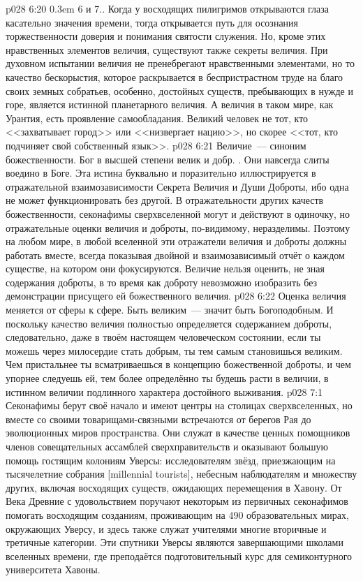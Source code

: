 \vs p028 6:20 \kern0.3em 6 и 7.\bibnobreakspace{}. Когда у восходящих пилигримов открываются глаза касательно значения времени, тогда открывается путь для осознания торжественности доверия и понимания святости служения. Но, кроме этих нравственных элементов величия, существуют также секреты величия. При духовном испытании величия не пренебрегают нравственными элементами, но то качество бескорыстия, которое раскрывается в беспристрастном труде на благо своих земных собратьев, особенно, достойных существ, пребывающих в нужде и горе, является истинной  планетарного величия. А  величия в таком мире, как Урантия, есть проявление самообладания. Великий человек не тот, кто <<захватывает город>> или <<низвергает нацию>>, но скорее <<тот, кто подчиняет свой собственный язык>>.
\vs p028 6:21 Величие~--- синоним божественности. Бог в высшей степени велик и добр. . Они навсегда слиты воедино в Боге. Эта истина буквально и поразительно иллюстрируется в отражательной взаимозависимости Секрета Величия и Души Доброты, ибо одна не может функционировать без другой. В отражательности других качеств божественности, секонафимы сверхвселенной могут и действуют в одиночку, но отражательные оценки величия и доброты, по\hyp{}видимому, неразделимы. Поэтому на любом мире, в любой вселенной эти отражатели величия и доброты должны работать вместе, всегда показывая двойной и взаимозависимый отчёт о каждом существе, на котором они фокусируются. Величие нельзя оценить, не зная содержания доброты, в то время как доброту невозможно изобразить без демонстрации присущего ей божественного величия.
\vs p028 6:22 Оценка величия меняется от сферы к сфере. Быть великим~--- значит быть Богоподобным. И поскольку качество величия полностью определяется содержанием доброты, следовательно, даже в твоём настоящем человеческом состоянии, если ты можешь через милосердие стать добрым, ты тем самым становишься великим. Чем пристальнее ты всматриваешься в концепцию божественной доброты, и чем упорнее следуешь ей, тем более определённо ты будешь расти в величии, в истинном величии подлинного характера достойного выживания.
\vs p028 7:1 Секонафимы берут своё начало и имеют центры на столицах сверхвселенных, но вместе со своими товарищами\hyp{}связными встречаются от берегов Рая до эволюционных миров пространства. Они служат в качестве ценных помощников членов совещательных ассамблей сверхправительств и оказывают большую помощь гостящим колониям Уверсы: исследователям звёзд, приезжающим на тысячелетние собрания [millennial tourists], небесным наблюдателям и множеству других, включая восходящих существ, ожидающих перемещения в Хавону. От Века Древние с удовольствием поручают некоторым из первичных секонафимов помогать восходящим созданиям, проживающим на 490 образовательных мирах, окружающих Уверсу, и здесь также служат учителями многие вторичные и третичные категории. Эти спутники Уверсы являются завершающими школами вселенных времени, где преподаётся подготовительный курс для семиконтурного университета Хавоны.
